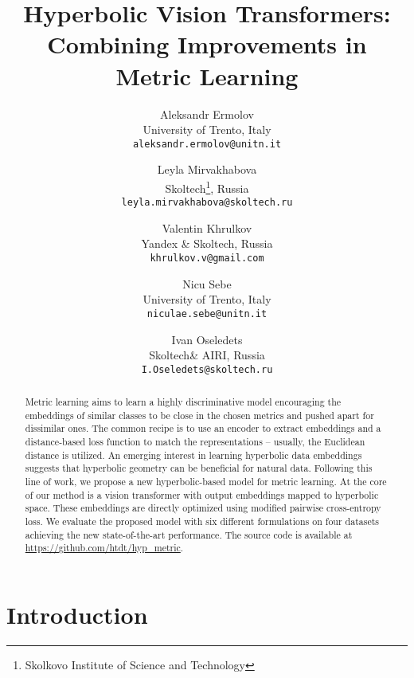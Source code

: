 \documentclass[10pt,twocolumn,letterpaper]{article}
\begin{document}
\title{Hyperbolic Vision Transformers: Combining Improvements in Metric Learning}

\author{Aleksandr Ermolov\\
University of Trento, Italy\\
{\tt\small aleksandr.ermolov@unitn.it}
\and
Leyla Mirvakhabova\\
Skoltech\thanks{Skolkovo Institute of Science and Technology}, Russia\\
{\tt\small leyla.mirvakhabova@skoltech.ru}
\and
Valentin Khrulkov\\
Yandex \& Skoltech\footnotemark[1], Russia\\
{\tt\small khrulkov.v@gmail.com}
\and
Nicu Sebe\\
University of Trento, Italy\\
{\tt\small niculae.sebe@unitn.it}
\and
Ivan Oseledets\\
Skoltech\footnotemark[1] \& AIRI, Russia\\
{\tt\small I.Oseledets@skoltech.ru}
}
\maketitle

\begin{abstract}
Metric learning aims to learn a highly discriminative model encouraging the embeddings of similar classes to be close in the chosen metrics and pushed apart for dissimilar ones. The common recipe is to use an encoder to extract embeddings and a distance-based loss function to match the representations -- usually, the Euclidean distance is utilized. An emerging interest in learning hyperbolic data embeddings suggests that hyperbolic geometry can be beneficial for natural data. Following this line of work, we propose a new hyperbolic-based model for metric learning. At the core of our method is a vision transformer with output embeddings mapped to hyperbolic space. These embeddings are directly optimized using modified pairwise cross-entropy loss. We evaluate the proposed model with six different formulations on four datasets achieving the new state-of-the-art performance. The source code is available at \url{https://github.com/htdt/hyp_metric}.
\end{abstract}

\section{Introduction}
\label{sec:intro}
\end{document}
